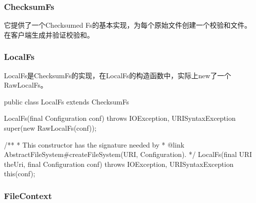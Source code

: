 \subsubsection{ChecksumFs}
它提供了一个Checksumed Fs的基本实现，为每个原始文件创建一个校验和文件。在客户端生成并验证校验和。


\subsubsection{LocalFs}
LocalFs是ChecksumFs的实现，在LocalFs的构造函数中，实际上new了一个RawLocalFs。

\begin{java}
public class LocalFs extends ChecksumFs {
  LocalFs(final Configuration conf) throws IOException, URISyntaxException {
    super(new RawLocalFs(conf));
  }

  /**
   * This constructor has the signature needed by
   * {@link AbstractFileSystem#createFileSystem(URI, Configuration)}.
   */
  LocalFs(final URI theUri, final Configuration conf) throws IOException,
      URISyntaxException {
    this(conf);
  }
}
\end{java}



\subsubsection{FileContext}
